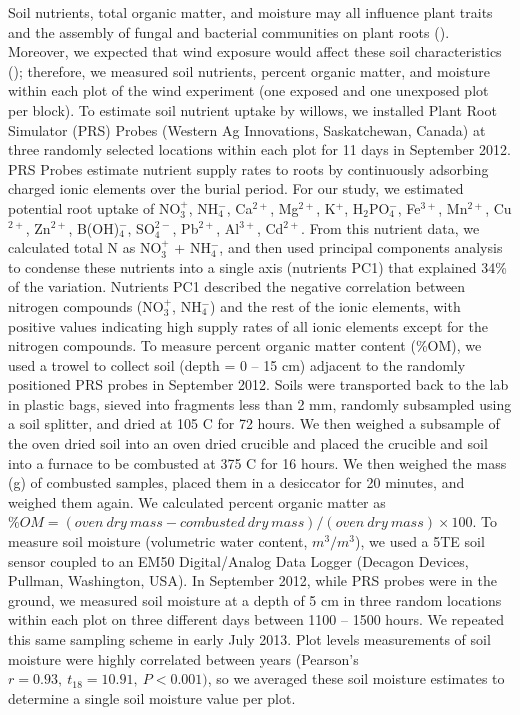 \documentclass[11pt]{article}
\begin{document}
Soil nutrients, total organic matter, and moisture may all influence
plant traits and the assembly of fungal and bacterial communities on
plant roots (\citealt{Erlandson_2015}). Moreover, we expected that wind exposure
would affect these soil characteristics (\citealt{LORTIE_2007}); therefore, we
measured soil nutrients, percent organic matter, and moisture within
each plot of the wind experiment (one exposed and one unexposed plot per
block). To estimate soil nutrient uptake by willows, we installed Plant
Root Simulator (PRS) Probes (Western Ag Innovations, Saskatchewan,
Canada) at three randomly selected locations within each plot for 11
days in September 2012. PRS Probes estimate nutrient supply rates to
roots by continuously adsorbing charged ionic elements over the burial
period. For our study, we estimated potential root uptake of NO$_3^+$, NH$_4^-$,
Ca$^{2+}$, Mg$^{2+}$, K$^+$, H$_2$PO$_4^-$, Fe$^{3+}$, Mn$^{2+}$, Cu$^{2+}$, Zn$^{2+}$, B(OH)$_4^-$, SO$_4^{2-}$, Pb$^{2+}$, Al$^{3+}$, Cd$^{2+}$. From this nutrient
data, we calculated total N as NO$_3^+$ + NH$_4^-$, and then used principal
components analysis to condense these nutrients into a single axis
(nutrients PC1) that explained 34\% of the variation. Nutrients PC1
described the negative correlation between nitrogen compounds (NO$_3^+$, NH$_4^-$) and the rest of the ionic elements, with positive values
indicating high supply rates of all ionic elements except for the
nitrogen compounds. To measure percent organic matter content (\%OM), we
used a trowel to collect soil (depth = 0 -- 15 cm) adjacent to the
randomly positioned PRS probes in September 2012. Soils were transported
back to the lab in plastic bags, sieved into fragments less than 2 mm,
randomly subsampled using a soil splitter, and dried at 105 \degree C
for 72 hours. We then weighed a subsample of the oven dried soil into an
oven dried crucible and placed the crucible and soil into a furnace to
be combusted at 375 \degree C for 16 hours. We then weighed the mass (g) of combusted samples, placed them in a desiccator for 20 minutes, and
weighed them again. We calculated percent organic matter
as $\%OM=(oven\ dry\ mass - combusted\ dry\ mass)/(oven\ dry\ mass)\times100$. To measure soil moisture (volumetric water content,
$m^3/m^3$), we used a 5TE soil sensor coupled to an EM50
Digital/Analog Data Logger (Decagon Devices, Pullman, Washington, USA).
In September 2012, while PRS probes were in the ground, we measured soil
moisture at a depth of 5 cm in three random locations within each plot
on three different days between 1100 -- 1500 hours. We repeated this
same sampling scheme in early July 2013. Plot levels measurements of
soil moisture were highly correlated between years (Pearson's
\(r=0.93,\ t_{18}=10.91,\ P<0.001)\), so we averaged these soil moisture estimates to
determine a single soil moisture value per plot.
\end{document}
